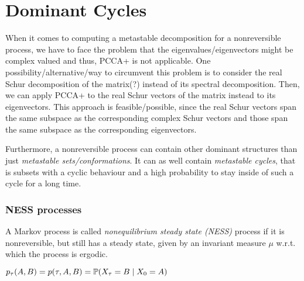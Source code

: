\section{Dominant Cycles}
\label{sec:nonreversible}

When it comes to computing a metastable decomposition for a nonreversible process, we have to face the problem that the eigenvalues/eigenvectors might be complex valued and thus, PCCA+ is not applicable. 
One possibility/alternative/way to circumvent this problem is to consider the real Schur decomposition of the matrix(?) instead of its spectral decomposition. Then, we can apply PCCA+ to the real Schur vectors of the matrix instead to its eigenvectors.
This approach is feasible/possible, since the real Schur vectors span the same subspace as the corresponding complex Schur vectors and those span the same subspace as the corresponding eigenvectors. 


Furthermore, a nonreversible process can contain other dominant structures than just \textit{metastable sets/conformations}. It can as well contain \textit{metastable cycles}, that is subsets with a cyclic behaviour and a high probability to stay inside of such a cycle for a long time.


\subsubsection*{NESS processes}


\begin{defi}
A Markov process is called \textit{nonequilibrium steady state (NESS)} process if it is nonreversible, but still has a steady state,  given by an invariant measure $\mu$ w.r.t. which the process is ergodic.
\end{defi}

$p_\tau(A,B) = p(\tau,A,B) =  \mathbb{P}(X_\tau = B \mid X_0 = A)$

